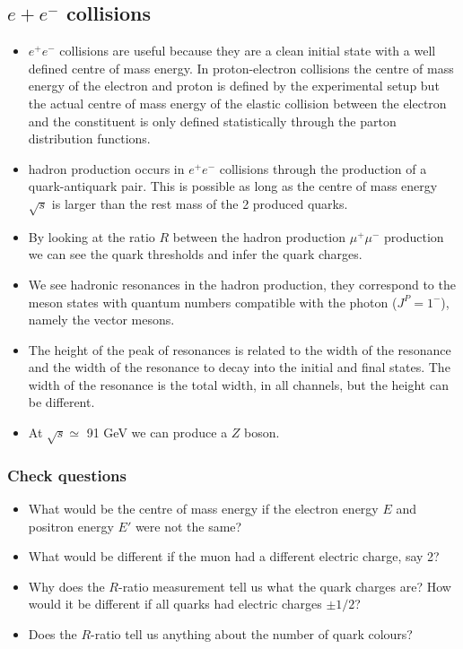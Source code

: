 \documentclass[12pt]{article}
\begin{document}
\subsection{$e+e^-$ collisions}
\begin{itemize}
\item $e^+e^-$ collisions are useful because they are a clean initial state with a well defined centre of mass energy. In proton-electron collisions the centre of mass energy of the electron and proton is defined by the experimental setup but the actual centre of mass energy of the elastic collision between the electron and the constituent is only defined statistically through the parton distribution functions.
\item hadron production occurs in $e^+e^-$ collisions through the production of a quark-antiquark pair. This is possible as long as the centre of mass energy $\sqrt{s}$ is larger than the rest mass of the 2 produced quarks.
\item By looking at the ratio $R$ between the hadron production $\mu^+\mu^-$ production we can see the quark thresholds and infer the quark charges.
\item We see hadronic resonances in the hadron production, they correspond to the meson states with quantum numbers compatible with the photon ($J^P=1^-$), namely the vector mesons.
\item The height of the peak of resonances is related to the width of the resonance and the width of the resonance to decay into the initial and final states. The width of the resonance is the total width, in all channels, but the height can be different.
  \item At $\sqrt{s}\simeq$ 91 GeV we can produce a $Z$ boson.
\end{itemize}
\subsubsection{Check questions}
\begin{itemize}
\item What would be the centre of mass energy if the electron energy $E$ and positron energy $E'$ were not the same?
\item What would be different if the muon had a different electric charge, say 2?
\item Why does the $R$-ratio measurement tell us what the quark charges are? How would it be different if all quarks had electric charges $\pm 1/2$?
  \item Does the $R$-ratio tell us anything about the number of quark colours?
  \end{itemize}
\end{document}
